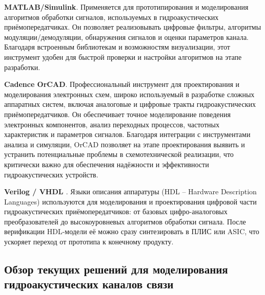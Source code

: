 \documentclass[
    numbers=section,
    document-code={ВКРБ--09.03.04--10.19--XX--26--81}
]{../latex/fqw}
\begin{document}
    \textbf{MATLAB/Simulink\nbspace\cite{themathworksinc.MATLABSimulinkSignal}}. Применяется для прототипирования и
    моделирования алгоритмов обработки сигналов, используемых в
    гидроакустических приёмопередатчиках. Он позволяет реализовывать
    цифровые фильтры, алгоритмы модуляции/демодуляции, обнаружения сигналов
    и оценки параметров канала. Благодаря встроенным библиотекам и
    возможностям визуализации, этот инструмент удобен для быстрой проверки и
    настройки алгоритмов на этапе разработки.

    \textbf{Cadence OrCAD\nbspace\cite{cadencedesignsystemsPCBDesignSoftware}}. Профессиональный инструмент для
    проектирования и моделирования электронных схем, широко используемый в
    разработке сложных аппаратных систем, включая аналоговые и цифровые
    тракты гидроакустических приёмопередатчиков. Он обеспечивает точное
    моделирование поведения электронных компонентов, анализ переходных
    процессов, частотных характеристик и параметров сигналов. Благодаря
    интеграции с инструментами анализа и симуляции, OrCAD позволяет на этапе
    проектирования выявить и устранить потенциальные проблемы в
    схемотехнической реализации, что критически важно для обеспечения
    надёжности и эффективности гидроакустических устройств.

    \textbf{
        Verilog\nbspace
        \cite{instituteofelectricalandelectronicsengineersIEEEStandardSystemVerilogUnified2024}
        / VHDL\nbspace
        \cite{instituteofelectricalandelectronicsengineersIEEEStandardVHDL2019}
    }.
    Языки описания аппаратуры (HDL -- Hardware Description Languages) используются для моделирования и
    проектирования цифровой части гидроакустических приёмопередатчиков:
    от базовых цифро-аналоговых преобразователей до высокоуровневых алгоритмов обработки сигнала.
    После верификации HDL-модели её можно сразу синтезировать в ПЛИС или ASIC,
    что ускоряет переход от прототипа к конечному продукту.

    \subsection{Обзор текущих решений для моделирования гидроакустических каналов связи}
    \label{subsec:Review_of_current_solutions_for_modeling_hydroacoustic_communication_channels}
    \vspace{\baselineskip}
\end{document}
